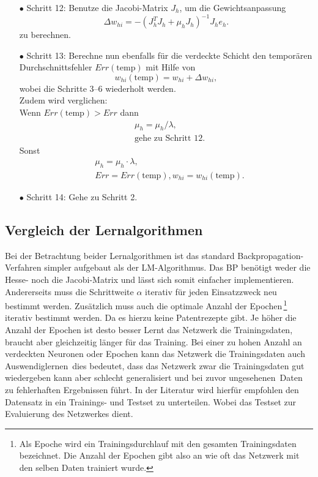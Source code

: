 \begin{itemize}
\item[\textbf{$\bullet$}] Schritt 12: Benutze die Jacobi-Matrix $J_{h}$, um die Gewichtsanpassung 
\begin{equation}
\Delta w_{hi}=-(J_{h}^T J_{h} + \mu_{h} J_{h})^{-1} J_{h} e_{h}.
\end{equation}
zu berechnen.

\item[\textbf{$\bullet$}] Schritt 13: Berechne nun ebenfalls für die verdeckte Schicht den temporären Durchschnittsfehler $Err(\text{temp})$ mit Hilfe von
\begin{equation}
w_{hi}(\text{temp})= w_{hi} + \Delta w_{hi},
\end{equation}
wobei die Schritte 3--6 wiederholt werden.\\
Zudem wird verglichen:\\
Wenn $Err(\text{temp}) > Err$ dann
\begin{align*}
&\mu_h = \mu_h / \lambda, \\
&\text{gehe zu Schritt 12.}
\end{align*}
Sonst
\begin{align*}
&\mu_h = \mu_h \cdot \lambda, \\
&Err=Err(\text{temp}), w_{hi}=w_{hi}(\text{temp}).
\end{align*}

\item[\textbf{$\bullet$}] Schritt 14: Gehe zu Schritt 2.
\end{itemize}

\subsection{Vergleich der Lernalgorithmen}\label{sec:vergleich_la}

Bei der Betrachtung beider Lernalgorithmen ist das standard Backpropagation-Verfahren simpler aufgebaut als der LM-Algorithmus. Das BP benötigt weder die Hesse- noch die Jacobi-Matrix und lässt sich somit einfacher implementieren. Andererseits muss die Schrittweite $\alpha$ iterativ für jeden Einsatzzweck neu bestimmt werden. Zusätzlich muss auch die optimale Anzahl der Epochen\,\footnote{Als Epoche wird ein Trainingsdurchlauf mit den gesamten Trainingsdaten bezeichnet. Die Anzahl der Epochen gibt also an wie oft das Netzwerk mit den selben Daten trainiert wurde.%
} iterativ bestimmt werden. Da es hierzu keine Patentrezepte gibt. Je höher die Anzahl der Epochen ist desto besser Lernt das Netzwerk die Trainingsdaten, braucht aber gleichzeitig länger für das Training. Bei einer zu hohen Anzahl an verdeckten Neuronen oder Epochen kann das Netzwerk die Trainingsdaten auch \glqq Auswendiglernen\grqq~dies bedeutet, dass das Netzwerk zwar die Trainingsdaten gut wiedergeben kann aber schlecht generalisiert und bei zuvor \glqq ungesehenen\grqq~Daten zu fehlerhaften Ergebnissen führt. In der Literatur wird hierfür empfohlen den Datensatz in ein Trainings- und Testset zu unterteilen. Wobei das Testset zur Evaluierung des Netzwerkes dient.\,

